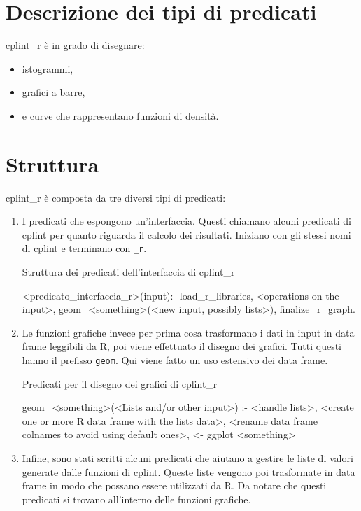 \documentclass[10pt,titlepage,twoside,a4paper]{report}
\newenvironment{code}{\singlespacing\captionsetup{type=listing}}{}
\begin{document}
\section{Descrizione dei tipi di predicati}
cplint\_r è in grado di disegnare:
\begin{itemize}
    \item istogrammi,
    \item grafici a barre,
    \item e curve che rappresentano funzioni di densità.
\end{itemize}

\section{Struttura}
cplint\_r è composta da tre diversi tipi di predicati:
\begin{enumerate}
    \item I predicati che espongono un'interfaccia. Questi chiamano alcuni 
          predicati di cplint per quanto riguarda il calcolo dei risultati. 
Iniziano con gli stessi nomi di cplint e terminano con \texttt{\_r}.

        \begin{code}
            \caption{Struttura dei predicati dell'interfaccia di cplint\_r}
            \begin{prologcode*}{}
<predicato_interfaccia_r>(input):-
    load_r_libraries,
    <operations on the input>,
    geom_<something>(<new input, possibly lists>),
    finalize_r_graph.
            \end{prologcode*}
        \end{code}
    \item Le funzioni grafiche invece per prima cosa trasformano i dati in 
          input in data frame leggibili da R, poi viene effettuato il disegno 
          dei grafici. Tutti questi hanno il prefisso \texttt{geom}. Qui viene 
fatto un uso estensivo dei data frame.

    \begin{code}
        \caption{Predicati per il disegno dei grafici di cplint\_r}
        \begin{prologcode*}{}
geom_<something>(<Lists and/or other input>) :-
    <handle lists>,
    <create one or more R data frame with the lists data>,
    <rename data frame colnames to avoid using default ones>,
    <- ggplot <something>
        \end{prologcode*}
    \end{code}
    \item Infine, sono stati scritti alcuni predicati che aiutano a gestire le 
          liste di valori generate dalle funzioni di cplint. Queste liste 
          vengono poi trasformate in data frame in modo che possano 
          essere utilizzati da R. Da notare che questi predicati si trovano 
          all'interno delle funzioni grafiche.
\end{enumerate}
\end{document}

